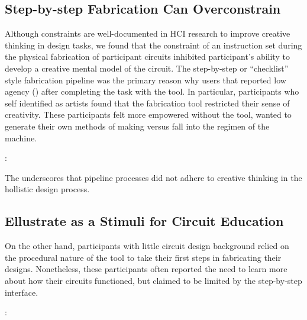 \documentclass{sigchi}
\begin{document}
  \subsection{Step-by-step Fabrication Can Overconstrain}
  Although constraints are well-documented in HCI research to improve creative thinking in design tasks, we found that the constraint of an instruction set during the physical fabrication of participant circuits inhibited participant's ability to develop a creative mental model of the circuit. The step-by-step or ``checklist'' style fabrication pipeline was the primary reason why users that reported low agency () after completing the task with the tool. In particular, participants who self identified as artists found that the fabrication tool restricted their sense of creativity. These participants felt more empowered without the tool, wanted to generate their own methods of making versus fall into the regimen of the machine.  
  \begin{myquote}
   \vspace{-2pt}
    :
    \vspace{-2pt}
  \end{myquote}
  The underscores that pipeline processes did not adhere to creative thinking in the hollistic design process. 
  \subsection{Ellustrate as a Stimuli for Circuit Education}
  On the other hand, participants with little circuit design background relied on the procedural nature of the tool to take their first steps in fabricating their designs. Nonetheless, these participants often reported the need to learn more about how their circuits functioned, but claimed to be limited by the step-by-step interface.
  
  \begin{myquote}
   \vspace{-2pt}
    :
    \vspace{-2pt}
  \end{myquote}
  
\end{document}

